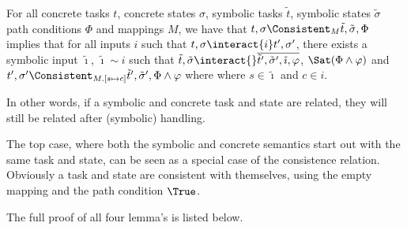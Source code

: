 \begin{lemma}
  \label{lem:completedriving}
  For all concrete tasks $t$, concrete states $\sigma$, symbolic tasks $\tilde{t}$, symbolic states $\tilde{\sigma}$ path conditions $\Phi$ and mappings $M$,
  we have that $t,\sigma\Consistent_{M}\tilde{t},\tilde{\sigma},\Phi$ implies
  that for all inputs $i$ such that $t,\sigma\interact{i}t',\sigma'$,
  there exists a symbolic input $\tilde{\imath}$, $\tilde{\imath}\sim i$ such that
  $\tilde{t},\tilde{\sigma}\interact{}\overline{\tilde{t}',\tilde{\sigma}',\tilde{\imath},\phi}$, $\Sat(\Phi\land\phi)$ and $t',\sigma'\Consistent_{M.[s\mapsto c]}\tilde{t}',\tilde{\sigma}',\Phi\land\phi$ where where $s\in\tilde{\imath}$ and $c\in i$.
\end{lemma}

In other words, if a symbolic and concrete task and state are related, they will still be related after (symbolic) handling.

The top case, where both the symbolic and concrete semantics start out with the same task and state, can be seen as a special case of the consistence relation.
Obviously a task and state are consistent with themselves, using the empty mapping and the path condition $\True$.

The full proof of all four lemma's is listed below.

